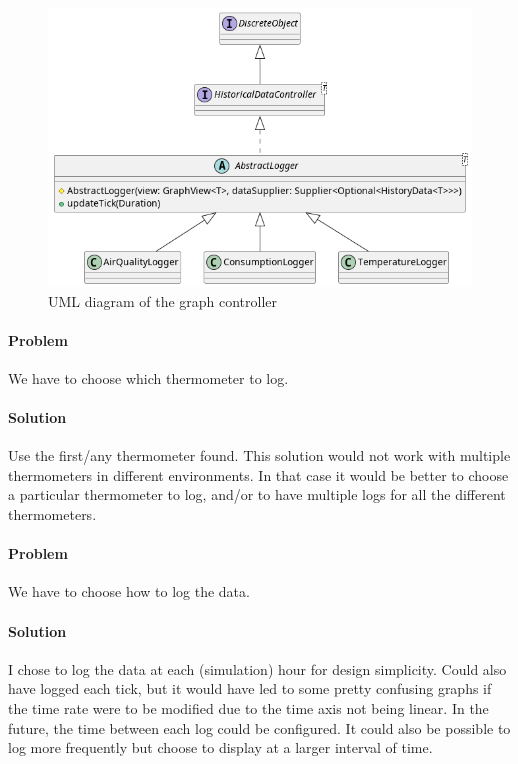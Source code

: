 \begin{figure}[H]
\centering{}
\includegraphics[width=\textwidth,height=\textheight,keepaspectratio]{magnani/uml/graph-controller.png}
\caption{UML diagram of the graph controller}
\label{magnani:uml:graph-controller}
\end{figure}

\paragraph{Problem} We have to choose which thermometer to log.
\paragraph{Solution} Use the first/any thermometer found.
This solution would not work with multiple thermometers in different environments.
In that case it would be better to choose a particular thermometer to log, and/or to have multiple logs for all the different thermometers.

\paragraph{Problem} We have to choose how to log the data.
\paragraph{Solution} I chose to log the data at each (simulation) hour for design simplicity.
Could also have logged each tick, but it would have led to some pretty confusing graphs if the time rate were to be modified
due to the time axis not being linear.
In the future, the time between each log could be configured.
It could also be possible to log more frequently but choose to display at a larger interval of time.

